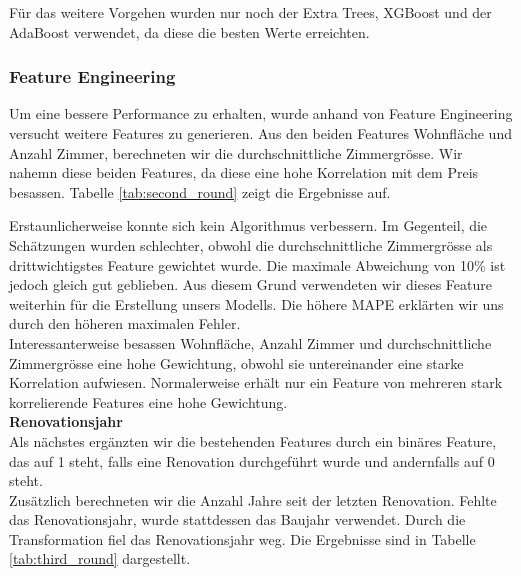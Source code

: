 Für das weitere Vorgehen wurden nur noch der Extra Trees, XGBoost und der AdaBoost verwendet, da diese die besten Werte erreichten.
\subsubsection{Feature Engineering}
Um eine bessere Performance zu erhalten, wurde anhand von Feature Engineering versucht weitere Features zu generieren. Aus den beiden Features Wohnfläche und Anzahl Zimmer, berechneten wir die durchschnittliche Zimmergrösse. Wir nahemn diese beiden Features, da diese eine hohe Korrelation mit dem Preis besassen. Tabelle \ref{tab:second_round} zeigt die Ergebnisse auf.

\begin{table}[ht]
\centering
{}
\caption{Ergebnisse mit durchschnittlicher Zimmergrösse}
\label{tab:second_round}
\end{table}

Erstaunlicherweise konnte sich kein Algorithmus verbessern. Im Gegenteil, die Schätzungen wurden schlechter, obwohl die durchschnittliche Zimmergrösse als drittwichtigstes Feature gewichtet wurde. Die maximale Abweichung von 10\% ist jedoch gleich gut geblieben. Aus diesem Grund verwendeten wir dieses Feature weiterhin für die Erstellung unsers Modells. Die höhere MAPE erklärten wir uns durch den höheren maximalen Fehler.\\
Interessanterweise besassen Wohnfläche, Anzahl Zimmer und durchschnittliche Zimmergrösse eine hohe Gewichtung, obwohl sie untereinander eine starke Korrelation aufwiesen. Normalerweise erhält nur ein Feature von mehreren stark korrelierende Features eine hohe Gewichtung.\\[2ex]
%
\textbf{Renovationsjahr}\\
Als nächstes ergänzten wir die bestehenden Features durch ein binäres Feature, das auf 1 steht, falls eine Renovation durchgeführt wurde und andernfalls auf 0 steht.\\
Zusätzlich berechneten wir die Anzahl Jahre seit der letzten Renovation. Fehlte das Renovationsjahr, wurde stattdessen das Baujahr verwendet. Durch die Transformation fiel das Renovationsjahr weg. Die Ergebnisse sind in Tabelle \ref{tab:third_round} dargestellt.

